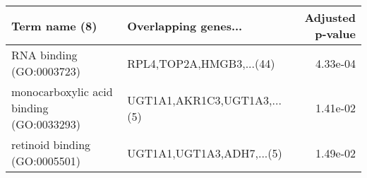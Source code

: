\begin{tabular}{llr}
\toprule
                           Term name (8) &        Overlapping genes... &  Adjusted p-value \\
\midrule
                RNA binding (GO:0003723) &    RPL4,TOP2A,HMGB3,...(44) &          4.33e-04 \\
monocarboxylic acid binding (GO:0033293) & UGT1A1,AKR1C3,UGT1A3,...(5) &          1.41e-02 \\
           retinoid binding (GO:0005501) &   UGT1A1,UGT1A3,ADH7,...(5) &          1.49e-02 \\
\bottomrule
\end{tabular}
